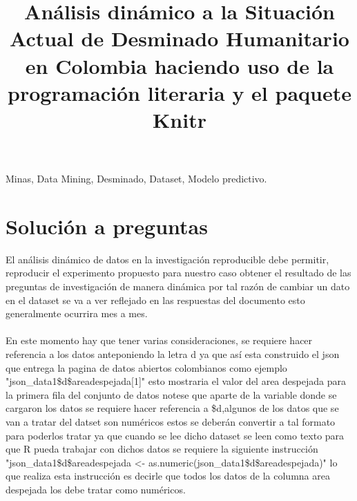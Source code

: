 \documentclass[conference]{IEEEtran}\usepackage[]{graphicx}\usepackage[]{color}
\begin{document}
	
	
\title{Análisis dinámico  a la Situación Actual de Desminado Humanitario en Colombia haciendo uso de la programación literaria y el paquete Knitr}

\author{
}
\maketitle



\begin{IEEEkeywords}
	Minas, Data Mining, Desminado, Dataset, Modelo predictivo.
\end{IEEEkeywords}






	

\section{Solución a preguntas}
El análisis dinámico de datos en la investigación reproducible debe permitir, reproducir el experimento propuesto para nuestro caso obtener el resultado de las preguntas de investigación de manera dinámica por tal razón de cambiar un dato en el dataset se va a ver reflejado en las respuestas del documento esto generalmente ocurrira mes a mes.
\\
\\
En este momento hay que tener varias consideraciones, se requiere hacer referencia a los datos anteponiendo la letra d ya que así esta construido el json que entrega la pagina de datos abiertos colombianos como ejemplo "json_data1\$d\$areadespejada[1]" esto mostraria el valor del area despejada para la primera fila del conjunto de datos notese que aparte de la variable donde se cargaron los datos se requiere hacer referencia a \$d,algunos de los datos que se van a tratar del datset son numéricos estos se deberán convertir a tal formato para poderlos tratar ya que cuando se lee dicho dataset se leen como texto para que R pueda trabajar con dichos datos se requiere la siguiente instrucción "json_data1\$d\$areadespejada <- as.numeric(json_data1\$d\$areadespejada)" lo que realiza esta instrucción es decirle que todos los datos de la columna area despejada los debe tratar como numéricos. 
\end{document}
